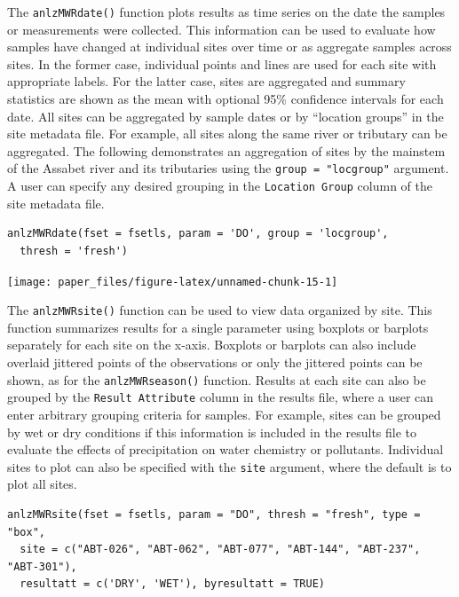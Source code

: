 The \texttt{anlzMWRdate()} function plots results as time series on the date the samples or measurements were collected. This information can be used to evaluate how samples have changed at individual sites over time or as aggregate samples across sites. In the former case, individual points and lines are used for each site with appropriate labels. For the latter case, sites are aggregated and summary statistics are shown as the mean with optional 95\% confidence intervals for each date. All sites can be aggregated by sample dates or by ``location groups'' in the site metadata file. For example, all sites along the same river or tributary can be aggregated. The following demonstrates an aggregation of sites by the mainstem of the Assabet river and its tributaries using the \texttt{group\ =\ "locgroup"} argument. A user can specify any desired grouping in the \texttt{Location\ Group} column of the site metadata file.

\begin{verbatim}
anlzMWRdate(fset = fsetls, param = 'DO', group = 'locgroup', 
  thresh = 'fresh')
\end{verbatim}

\begin{center}\texttt{[image: paper\_files/figure-latex/unnamed-chunk-15-1]} \end{center}

The \texttt{anlzMWRsite()} function can be used to view data organized by site. This function summarizes results for a single parameter using boxplots or barplots separately for each site on the x-axis. Boxplots or barplots can also include overlaid jittered points of the observations or only the jittered points can be shown, as for the \texttt{anlzMWRseason()} function. Results at each site can also be grouped by the \texttt{Result\ Attribute} column in the results file, where a user can enter arbitrary grouping criteria for samples. For example, sites can be grouped by wet or dry conditions if this information is included in the results file to evaluate the effects of precipitation on water chemistry or pollutants. Individual sites to plot can also be specified with the \texttt{site} argument, where the default is to plot all sites.

\begin{verbatim}
anlzMWRsite(fset = fsetls, param = "DO", thresh = "fresh", type = "box", 
  site = c("ABT-026", "ABT-062", "ABT-077", "ABT-144", "ABT-237", "ABT-301"),
  resultatt = c('DRY', 'WET'), byresultatt = TRUE)
\end{verbatim}


